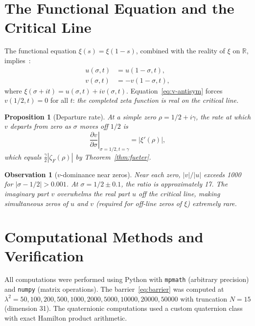 \documentclass[11pt,a4paper]{article}
\newtheorem{proposition}[theorem]{Proposition}
\newtheorem{observation}[theorem]{Observation}
\theoremstyle{definition}
\begin{document}
\section{The Functional Equation and the Critical Line}
\label{sec:fe}

The functional equation $\xi(s) = \xi(1-s)$, combined with the reality of $\xi$ on $\mathbb{R}$, implies~\cite{Titchmarsh1986}:
\begin{align}
u(\sigma, t) &= u(1 - \sigma, t), \label{eq:u-sym} \\
v(\sigma, t) &= -v(1 - \sigma, t), \label{eq:v-antisym}
\end{align}
where $\xi(\sigma + it) = u(\sigma, t) + iv(\sigma, t)$. Equation~\eqref{eq:v-antisym} forces $v(1/2, t) = 0$ for all $t$: \emph{the completed zeta function is real on the critical line.}

\begin{proposition}[Departure rate]
At a simple zero $\rho = 1/2 + i\gamma$, the rate at which $v$ departs from zero as $\sigma$ moves off $1/2$ is
\[
\left.\frac{\partial v}{\partial \sigma}\right|_{\sigma = 1/2, t = \gamma} = |\xi'(\rho)|,
\]
which equals $\frac{\gamma}{2} |\zeta_F(\rho)|$ by Theorem~\ref{thm:fueter}.
\end{proposition}

\begin{observation}[$v$-dominance near zeros]
Near each zero, $|v|/|u|$ exceeds 1000 for $|\sigma - 1/2| > 0.001$. At $\sigma = 1/2 \pm 0.1$, the ratio is approximately 17. The imaginary part $v$ overwhelms the real part $u$ off the critical line, making simultaneous zeros of $u$ and $v$ (required for off-line zeros of $\xi$) extremely rare.
\end{observation}

\section{Computational Methods and Verification}
\label{sec:computation}

All computations were performed using Python with \texttt{mpmath} (arbitrary precision) and \texttt{numpy} (matrix operations). The barrier~\eqref{eq:barrier} was computed at $\lambda^2 = 50, 100, 200, 500, 1000, 2000, 5000, 10000, 20000, 50000$ with truncation $N = 15$ (dimension 31). The quaternionic computations used a custom quaternion class with exact Hamilton product arithmetic.
\end{document}
